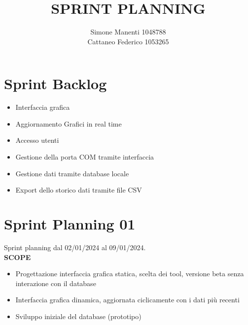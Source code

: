 \documentclass{report}
\title{SPRINT PLANNING}
\author{Simone Manenti 1048788 \\ Cattaneo Federico 1053265}
\begin{document}
\maketitle
\chapter{Sprint Backlog}
\begin{itemize}
\item Interfaccia grafica
\item Aggiornamento Grafici in real time
\item Accesso utenti
\item Gestione della porta COM tramite interfaccia
\item Gestione dati tramite database locale
\item Export dello storico dati tramite file CSV
\end{itemize}

\chapter{Sprint Planning 01}
Sprint planning dal 02/01/2024 al 09/01/2024.\\

\textbf{SCOPE}
\begin{itemize}
\item Progettazione interfaccia grafica statica, scelta dei tool, versione beta senza interazione con il database
\item Interfaccia grafica dinamica, aggiornata ciclicamente con i dati più recenti
\item Sviluppo iniziale del database (prototipo)
\end{itemize}
\end{document}
